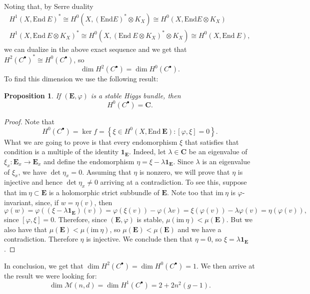 \documentclass[12pt,a4paper]{book}
\newtheorem{prop}[thm]{Proposition}
\theoremstyle{definition} \newtheorem{defn}[thm]{Definition}
\theoremstyle{definition} \newtheorem{ejemplo}[thm]{Example}
\theoremstyle{remark} \newtheorem{rem}[thm]{Remark}
\def\CC{\mathbf{C}}
\def\id{\mathbf{1}}
\def\im{\mathrm{im}\ }
\def\End{\mathrm{End}}
\def\Hig{\mathscr{M}}
\newcommand{\ve}[1]{\mathbf{#1}}
\begin{document}
	      Noting that, by Serre duality
	      \begin{align*}
		H^1(X,\End\ E)^*\cong H^0(X,(\End E)^* \otimes K_X) \cong H^0(X,\End E \otimes K_X) \\
		H^1(X,\End\ E \otimes K_X)^* \cong H^0(X,(\End\ E \otimes K_X)^*\otimes K_X) \cong H^0(X, \End\ E),
	      \end{align*}
	      we can dualize in the above exact sequence and we get that $H^2(C^\bullet)^*\cong H^0(C^\bullet)$, so $$\dim H^2(C^\bullet)=\dim H^0(C^\bullet).$$ 
	      To find this dimension we use the following result:
	      \begin{prop}
		If $(\ve{E},\varphi)$ is a stable Higgs bundle, then 
		\begin{equation*}
		  H^0(C^\bullet) = \CC.
		\end{equation*}
	      \end{prop}
	      \begin{proof}
	Note that 
	\begin{equation*}
	  H^0(C^\bullet)=\ker f = \left\{ \xi \in H^0(X,\End\ \ve{E}): [\varphi,\xi]=0 \right\}.
	\end{equation*}
	What we are going to prove is that every endomorphism $\xi$ that satisfies that condition is a multiple of the identity $\id_{\ve{E}}$. Indeed, let $\lambda \in \CC$ be an eigenvalue of $\xi_x:\ve{E}_x \rightarrow \ve{E}_x$ and define the endomorphism $\eta= \xi-\lambda \id_{\ve{E}}$. Since $\lambda$ is an eigenvalue of $\xi_x$, we have $\det \eta_x=0$. Assuming that $\eta$ is nonzero, we will prove that $\eta$ is injective and hence $\det \eta_x \neq 0$ arriving at a contradiction. To see this, suppose that $\im \eta \subset \ve{E}$ is a holomorphic strict subbundle of $\ve{E}$. Note too that $\im \eta$ is $\varphi$-invariant, since, if $w=\eta(v)$, then $$\varphi(w)=\varphi((\xi - \lambda \id_{\ve{E}})(v))= \varphi(\xi(v)) -  \varphi(\lambda v)=\xi(\varphi(v))-\lambda \varphi(v)=\eta(\varphi(v)),$$
	since $[\varphi,\xi]=0$. Therefore, since $(\ve{E},\varphi)$ is stable, $\mu(\im \eta) < \mu(\ve{E})$. But we also have that $\mu(\ve{E})<\mu(\im \eta)$, so $\mu(\ve{E})<\mu(\ve{E})$ and we have a contradiction. Therefore $\eta$ is injective. We conclude then that $\eta=0$, so $\xi=\lambda \id_{\ve{E}}$.
	      \end{proof}

	      In conclusion, we get that $\dim H^2(C^\bullet)=\dim H^0(C^\bullet)=1$. We then arrive at the result we were looking for:
	      \begin{equation*}
		\dim \Hig(n,d)=\dim H^1(C^\bullet)=2+2n^2(g-1).
	      \end{equation*}
\end{document}
